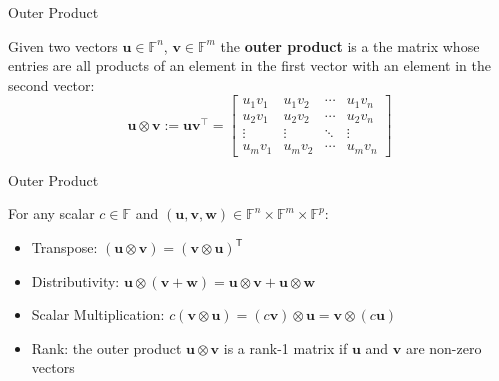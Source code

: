 \documentclass{zkdl-presentation-template}
\begin{document}
    \begin{frame}{Outer Product}
        \begin{definition}
            Given two vectors $\mathbf{u} \in \mathbb{F}^n$, $\mathbf{v} \in \mathbb{F}^m$ the 
            \textbf{outer product} is a the matrix whose entries are all products of an element in
            the first vector with an element in the second vector:
            \begin{equation*}
                \mathbf{u} \otimes \mathbf{v} := \mathbf{u}\mathbf{v}^{\top} = \begin{bmatrix}
                    u_1 v_1 & u_1 v_2 & \cdots & u_1 v_n \\
                    u_2 v_1 & u_2 v_2 & \cdots & u_2 v_n \\
                    \vdots & \vdots & \ddots & \vdots \\
                    u_m v_1 & u_m v_2 & \cdots & u_m v_n
                \end{bmatrix}
            \end{equation*}
        \end{definition}
    \end{frame}

    \begin{frame}{Outer Product}
        \begin{lemma}
            For any scalar $c \in \mathbb{F}$ and $(\mathbf{u}, \mathbf{v}, \mathbf{w}) \in \mathbb{F}^n \times \mathbb{F}^m \times \mathbb{F}^p$:
            \begin{itemize}
                \item Transpose: $(\mathbf{u} \otimes \mathbf{v}) = (\mathbf{v} \otimes \mathbf{u})^{\textsf{T}}$
                \item Distributivity: $\mathbf{u} \otimes (\mathbf{v} + \mathbf{w}) = \mathbf{u} \otimes \mathbf{v} + \mathbf{u} \otimes \mathbf{w}$
                \item Scalar Multiplication: $c(\mathbf{v} \otimes \mathbf{u}) = (c\mathbf{v}) \otimes \mathbf{u} = \mathbf{v} \otimes (c\mathbf{u})$
                \item Rank: the outer product $\mathbf{u} \otimes \mathbf{v}$ is a rank-1 matrix if $\mathbf{u}$ and $\mathbf{v}$ are non-zero
                vectors
            \end{itemize}
        \end{lemma}
    \end{frame}
\end{document}
